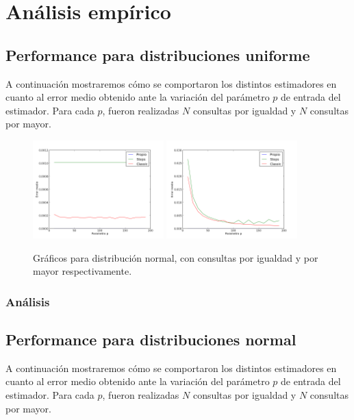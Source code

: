 \section{Análisis empírico}

\subsection{Performance para distribuciones uniforme}
A continuación mostraremos cómo se comportaron los distintos estimadores en cuanto al error medio obtenido ante la variación del parámetro $p$ de entrada del estimador. Para cada $p$, fueron realizadas $N$ consultas por igualdad y $N$ consultas por mayor.  

\begin{figure}[h!]
  \centering
  \includegraphics[width=0.45\textwidth]{images/normalEqual}
  \includegraphics[width=0.45\textwidth]{images/normalGreater}
  \caption{Gráficos para distribución normal, con consultas por igualdad y por mayor respectivamente.}
 \end{figure}

 \subsubsection*{Análisis}

 
 \subsection{Performance para distribuciones normal}
A continuación mostraremos cómo se comportaron los distintos estimadores en cuanto al error medio obtenido ante la variación del parámetro $p$ de entrada del estimador. Para cada $p$, fueron realizadas $N$ consultas por igualdad y $N$ consultas por mayor.  

